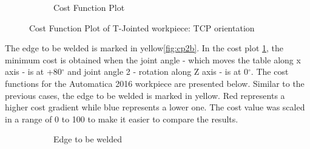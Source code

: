 \begin{figure}[!htbp]
\begin{subfigure}[b]{0.4\textwidth}
		\caption{Cost Function Plot}  
		\label{fig:cp2a}
	\end{subfigure}	
	\caption{Cost Function Plot of T-Jointed workpiece: TCP orientation}
	\label{fig:cp2}
\end{figure}
The edge to be welded is marked in yellow\ref{fig:cp2b}. In the cost plot \ref{fig:cp2a}, the minimum cost is obtained when the joint angle - which moves the table along x axis - is at +80$^{\circ}$ and joint angle 2 - rotation along Z axis - is at 0$^{\circ}$.
The cost functions for the Automatica 2016 workpiece are presented below. Similar to the previous cases, the edge to be welded is marked in yellow. Red represents a higher cost gradient while blue represents a lower one. The cost value was scaled in a range of 0 to 100 to make it easier to compare the results.

\begin{figure}[!htbp] %
	\centering
	\begin{subfigure}[b]{0.4\textwidth}
		\caption{Edge to be welded}  
		\label{fig:cp3b}
	\end{subfigure}
	\begin{subfigure}[b]{0.4\textwidth}

\end{subfigure}
\end{figure}
